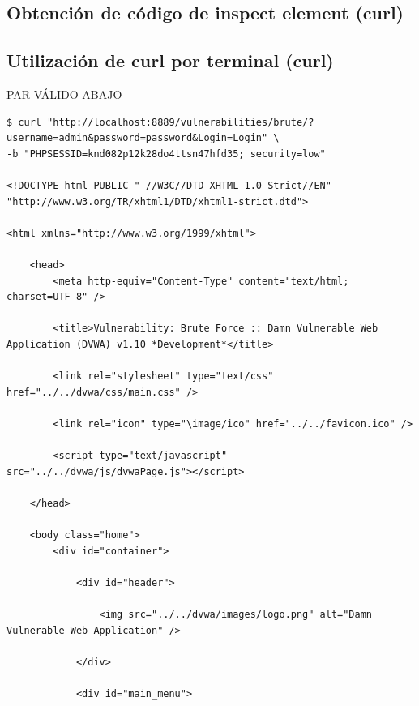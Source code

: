 \documentclass[letter,12pt]{article}
\begin{document}
\subsection{Obtención de código de inspect element (curl)}

\subsection{Utilización de curl por terminal (curl)}

PAR VÁLIDO ABAJO
\begin{verbatim}
$ curl "http://localhost:8889/vulnerabilities/brute/?username=admin&password=password&Login=Login" \
-b "PHPSESSID=knd082p12k28do4ttsn47hfd35; security=low"

<!DOCTYPE html PUBLIC "-//W3C//DTD XHTML 1.0 Strict//EN" "http://www.w3.org/TR/xhtml1/DTD/xhtml1-strict.dtd">

<html xmlns="http://www.w3.org/1999/xhtml">

	<head>
		<meta http-equiv="Content-Type" content="text/html; charset=UTF-8" />

		<title>Vulnerability: Brute Force :: Damn Vulnerable Web Application (DVWA) v1.10 *Development*</title>

		<link rel="stylesheet" type="text/css" href="../../dvwa/css/main.css" />

		<link rel="icon" type="\image/ico" href="../../favicon.ico" />

		<script type="text/javascript" src="../../dvwa/js/dvwaPage.js"></script>

	</head>

	<body class="home">
		<div id="container">

			<div id="header">

				<img src="../../dvwa/images/logo.png" alt="Damn Vulnerable Web Application" />

			</div>

			<div id="main_menu">


\end{verbatim}
\end{document}
